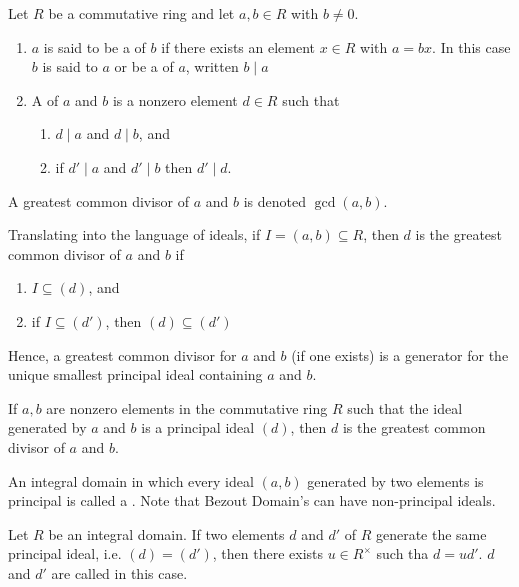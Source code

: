 \documentclass[12pt, a4paper, twoside, openright, titlepage]{book}
\begin{document}
\begin{defn}{}{}
    Let $R$ be a commutative ring and let $a,b \in R$ with $b \neq 0$. \begin{enumerate}
        \item $a$ is said to be a  of $b$ if there exists an element $x \in R$ with $a = bx$. In this case $b$ is said to  $a$ or be a  of $a$, written $b\;\vert\;a$
        \item A  of $a$ and $b$ is a nonzero element $d \in R$ such that \begin{enumerate}
                \item $d\;\vert\;a$ and $d\;\vert\;b$, and 
                \item if $d'\;\vert\;a$ and $d'\;\vert\;b$ then $d'\;\vert\;d$.
        \end{enumerate}
    \end{enumerate}
    A greatest common divisor of $a$ and $b$ is denoted $\gcd(a,b)$.
\end{defn}


\begin{rmk}{}{}
    Translating into the language of ideals, if $I = (a,b) \subseteq R$, then $d$ is the greatest common divisor of $a$ and $b$ if \begin{enumerate}
        \item $I \subseteq (d)$, and
        \item if $I \subseteq (d')$, then $(d) \subseteq (d')$
    \end{enumerate}
    Hence, a greatest common divisor for $a$ and $b$ (if one exists) is a generator for the unique smallest principal ideal containing $a$ and $b$.
\end{rmk}


\begin{prop}{}{}
    If $a,b$ are nonzero elements in the commutative ring $R$ such that the ideal generated by $a$ and $b$ is a principal ideal $(d)$, then $d$ is the greatest common divisor of $a$ and $b$.
\end{prop}

\begin{defn}{}{}
    An integral domain in which every ideal $(a,b)$ generated by two elements is principal is called a . Note that Bezout Domain's can have non-principal ideals.
\end{defn}

\begin{prop}{}{}
    Let $R$ be an integral domain. If two elements $d$ and $d'$ of $R$ generate the same principal ideal, i.e. $(d) = (d')$, then there exists $u \in R^{\times}$ such tha $d = ud'$. $d$ and $d'$ are called  in this case.
\end{prop}
\end{document}
